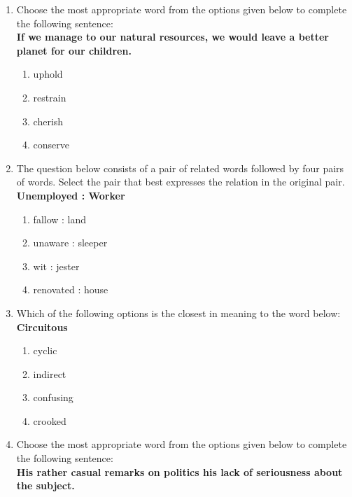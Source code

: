 \documentclass[journal,12pt,onecolumn]{IEEEtran}
\theoremstyle{remark}
\begin{document}
\begin{enumerate}
\item Choose the most appropriate word from the options given below to complete the following sentence: \\
\textbf{If we manage to \underline{\hspace{2cm}} our natural resources, we would leave a better planet for our children.}

\hfill{}
\begin{enumerate}
    \item uphold
    \item restrain
    \item cherish
    \item conserve
\end{enumerate}



\item The question below consists of a pair of related words followed by four pairs of words. Select the pair that best expresses the relation in the original pair. \\
\textbf{Unemployed : Worker}

\hfill{}
\begin{enumerate}
    \item fallow : land
    \item unaware : sleeper
    \item wit : jester
    \item renovated : house
\end{enumerate}



\item Which of the following options is the closest in meaning to the word below: \\
\textbf{Circuitous}
\hfill{}\begin{enumerate}
    \item cyclic
    \item indirect
    \item confusing
    \item crooked
\end{enumerate}



\item Choose the most appropriate word from the options given below to complete the following sentence: \\
\textbf{His rather casual remarks on politics \underline{\hspace{2cm}} his lack of seriousness about the subject.}
\hfill{}\begin{enumerate}  \end{enumerate}


\end{enumerate}
\end{document}

